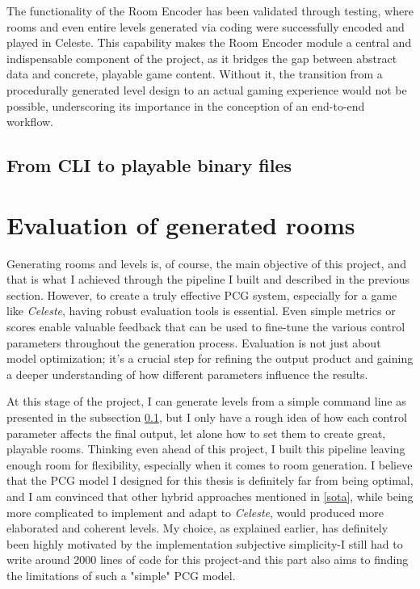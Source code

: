 \documentclass{article}
\newcommand{\Celnosp}{\textit{Celeste}}
\begin{document}
\noindent The functionality of the Room Encoder has been validated through testing, where rooms and even entire levels generated via coding were successfully encoded and played in Celeste. This capability makes the Room Encoder module a central and indispensable component of the project, as it bridges the gap between abstract data and concrete, playable game content. Without it, the transition from a procedurally generated level design to an actual gaming experience would not be possible, underscoring its importance in the conception of an end-to-end workflow.

\subsection{From CLI to playable binary files} \label{CLI}

\section{Evaluation of generated rooms}

Generating rooms and levels is, of course, the main objective of this project, and that is what I achieved through the pipeline I built and described in the previous section. However, to create a truly effective PCG system, especially for a game like \Celnosp, having robust evaluation tools is essential. Even simple metrics or scores enable valuable feedback that can be used to fine-tune the various control parameters throughout the generation process. Evaluation is not just about model optimization; it’s a crucial step for refining the output product and gaining a deeper understanding of how different parameters influence the results.

At this stage of the project, I can generate levels from a simple command line as presented in the subsection \ref{CLI}, but I only have a rough idea of how each control parameter affects the final output, let alone how to set them to create great, playable rooms. Thinking even ahead of this project, I built this pipeline leaving enough room for flexibility, especially when it comes to room generation. I believe that the PCG model I designed for this thesis is definitely far from being optimal, and I am convinced that other hybrid approaches mentioned in \ref{sota}, while being more complicated to implement and adapt to \Celnosp, would produced more elaborated and coherent levels. My choice, as explained earlier, has definitely been highly motivated by the implementation subjective simplicity-I still had to write around 2000 lines of code for this project-and this part also aims to finding the limitations of such a "simple" PCG model.
\end{document}
